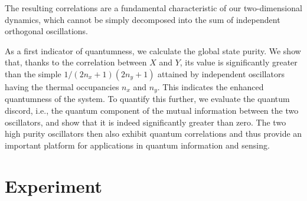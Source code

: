 \documentclass[11pt,floatfix,amssymb,prx,aps,longbibliography,superscriptaddress,nopacs]{revtex4-2}
\newcommand{\nX}{n_{\scriptstyle{x}}}
\newcommand{\nY}{n_{\scriptstyle{y}}}
\begin{document}
The resulting correlations are a fundamental characteristic of our two-dimensional dynamics, which cannot be simply decomposed into the sum of independent orthogonal oscillations.

As a first indicator of quantumness, we calculate the global state purity. We show that, thanks to the correlation between $X$ and $Y$, its value is significantly greater than the simple $ 1/(2\nX + 1)(2 \nY +1) $ attained by independent oscillators having the thermal occupancies $\nX$ and $\nY$. This indicates the enhanced quantumness of the system. To quantify this further, we evaluate the quantum discord, i.e., the quantum component of the mutual information between the two oscillators, and show that it is indeed significantly greater than zero. The two high purity oscillators then also exhibit quantum correlations and thus provide an important platform for applications in quantum information and sensing.

\section*{Experiment}
\end{document}
